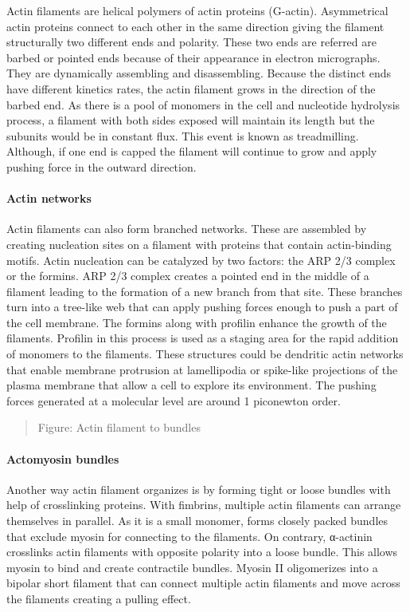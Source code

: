 \documentclass[
]{article}
\begin{document}
Actin filaments are helical polymers of actin proteins (G-actin).
Asymmetrical actin proteins connect to each other in the same direction
giving the filament structurally two different ends and polarity. These
two ends are referred are barbed or pointed ends because of their
appearance in electron micrographs. They are dynamically assembling and
disassembling. Because the distinct ends have different kinetics rates,
the actin filament grows in the direction of the barbed end. As there is
a pool of monomers in the cell and nucleotide hydrolysis process, a
filament with both sides exposed will maintain its length but the
subunits would be in constant flux. This event is known as treadmilling.
Although, if one end is capped the filament will continue to grow and
apply pushing force in the outward direction.

\hypertarget{actin-networks}{%
\paragraph{Actin networks}\label{actin-networks}}

Actin filaments can also form branched networks. These are assembled by
creating nucleation sites on a filament with proteins that contain
actin-binding motifs. Actin nucleation can be catalyzed by two factors:
the ARP 2/3 complex or the formins. ARP 2/3 complex creates a pointed
end in the middle of a filament leading to the formation of a new branch
from that site. These branches turn into a tree-like web that can apply
pushing forces enough to push a part of the cell membrane. The formins
along with profilin enhance the growth of the filaments. Profilin in
this process is used as a staging area for the rapid addition of
monomers to the filaments. These structures could be dendritic actin
networks that enable membrane protrusion at lamellipodia or spike-like
projections of the plasma membrane that allow a cell to explore its
environment. The pushing forces generated at a molecular level are
around 1 piconewton order.

\begin{quote}
Figure: Actin filament to bundles
\end{quote}

\hypertarget{actomyosin-bundles}{%
\paragraph{Actomyosin bundles}\label{actomyosin-bundles}}

Another way actin filament organizes is by forming tight or loose
bundles with help of crosslinking proteins. With fimbrins, multiple
actin filaments can arrange themselves in parallel. As it is a small
monomer, forms closely packed bundles that exclude myosin for connecting
to the filaments. On contrary, α-actinin crosslinks actin filaments with
opposite polarity into a loose bundle. This allows myosin to bind and
create contractile bundles. Myosin II oligomerizes into a bipolar short
filament that can connect multiple actin filaments and move across the
filaments creating a pulling effect.
\end{document}
